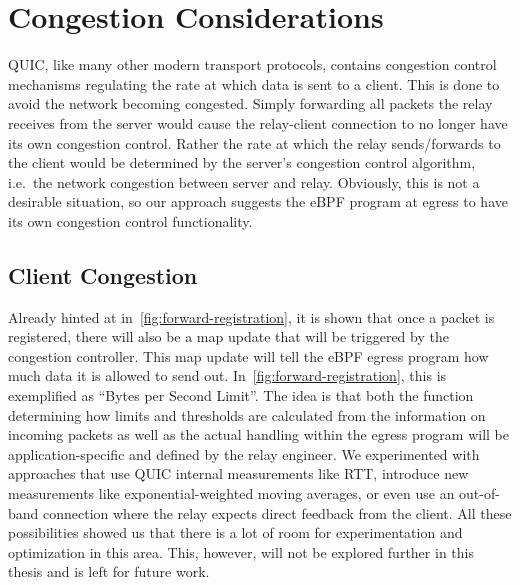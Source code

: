\section{Congestion Considerations}\label{sec:congestion_considerations}
QUIC, like many other modern transport protocols, contains congestion 
control mechanisms regulating the rate at which data is sent to a client.
This is done to avoid the network becoming congested.
Simply forwarding all packets the relay receives from the server would cause 
the relay-client connection to no longer have its own congestion control.
Rather the rate at which the relay sends/forwards to the client would be determined
by the server's congestion control algorithm, i.e.~the network congestion between 
server and relay.
Obviously, this is not a desirable situation, so our approach suggests the eBPF 
program at egress to have its own congestion control functionality.

\subsection{Client Congestion}
Already hinted at in~\autoref{fig:forward-registration}, it is shown that once a packet is 
registered, there will also be a map update that will be triggered by the congestion controller.
This map update will tell the eBPF egress program how much data it is allowed to send out. 
In~\autoref{fig:forward-registration}, this is exemplified as ``Bytes per Second Limit''.
The idea is that both the function determining how limits and thresholds are calculated from 
the information on incoming packets as well as the actual handling within the egress program 
will be application-specific and defined by the relay engineer.
We experimented with approaches that use QUIC internal measurements like RTT, 
introduce new measurements like exponential-weighted moving averages, or even use an 
out-of-band connection where the relay expects direct feedback from the client.
All these possibilities showed us that there is a lot of room for experimentation and optimization
in this area.
This, however, will not be explored further in this thesis and is left for future work.

